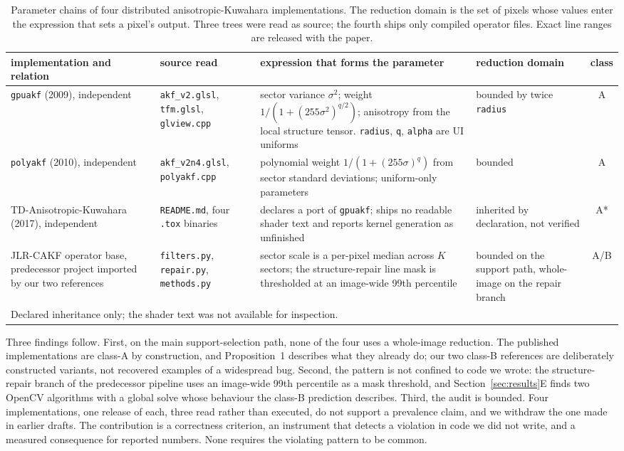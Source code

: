 \documentclass[journal]{IEEEtran}
\begin{document}
\begin{table}[t]
\caption{Parameter chains of four distributed anisotropic-Kuwahara implementations. The reduction domain is the set of pixels whose values enter the expression that sets a pixel's output. Three trees were read as source; the fourth ships only compiled operator files. Exact line ranges are released with the paper.}
\label{tab:audit}
\centering
\footnotesize
\begin{tabular}{@{}p{}p{}p{}p{}c@{}}
\toprule
implementation and relation & source read & expression that forms the parameter & reduction domain & class \\
\midrule
\texttt{gpuakf} (2009), independent & \texttt{akf\_v2.glsl}, \texttt{tfm.glsl}, \texttt{glview.cpp} & sector variance $\sigma^2$; weight $1/(1+(255\sigma^2)^{q/2})$; anisotropy from the local structure tensor. \texttt{radius}, \texttt{q}, \texttt{alpha} are UI uniforms & bounded by twice \texttt{radius} & A \\
\texttt{polyakf} (2010), independent & \texttt{akf\_v2n4.glsl}, \texttt{polyakf.cpp} & polynomial weight $1/(1+(255\sigma)^q)$ from sector standard deviations; uniform-only parameters & bounded & A \\
TD-Anisotropic-Kuwahara (2017), independent & \texttt{README.md}, four \texttt{.tox} binaries & declares a port of \texttt{gpuakf}; ships no readable shader text and reports kernel generation as unfinished & inherited by declaration, not verified & A* \\
JLR-CAKF operator base, predecessor project imported by our two references & \texttt{filters.py}, \texttt{repair.py}, \texttt{methods.py} & sector scale is a per-pixel median across $K$ sectors; the structure-repair line mask is thresholded at an image-wide 99th percentile & bounded on the support path, whole-image on the repair branch & A/B \\
\bottomrule
\multicolumn{5}{l}{\footnotesize *Declared inheritance only; the shader text was not available for inspection.}
\end{tabular}
\end{table}

Three findings follow. First, on the main support-selection path, none of the four uses a whole-image reduction. The published implementations are class-A by construction, and Proposition~1 describes what they already do; our two class-B references are deliberately constructed variants, not recovered examples of a widespread bug. Second, the pattern is not confined to code we wrote: the structure-repair branch of the predecessor pipeline uses an image-wide 99th percentile as a mask threshold, and Section~\ref{sec:results}E finds two OpenCV algorithms with a global solve whose behaviour the class-B prediction describes. Third, the audit is bounded. Four implementations, one release of each, three read rather than executed, do not support a prevalence claim, and we withdraw the one made in earlier drafts. The contribution is a correctness criterion, an instrument that detects a violation in code we did not write, and a measured consequence for reported numbers. None requires the violating pattern to be common.
\end{document}
